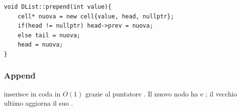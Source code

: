 \begin{codebox}
    \begin{lstlisting}
void DList::prepend(int value){
    cell* nuova = new cell{value, head, nullptr};
    if(head != nullptr) head->prev = nuova;
    else tail = nuova;
    head = nuova;
}
    \end{lstlisting}
\end{codebox}

\subsubsection{Append}
 inserisce in coda in $O(1)$ grazie al puntatore .
Il nuovo nodo ha  e ; il vecchio
ultimo aggiorna il suo .

